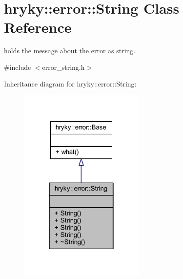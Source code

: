 \hypertarget{classhryky_1_1error_1_1_string}{\section{hryky\-:\-:error\-:\-:String Class Reference}
\label{classhryky_1_1error_1_1_string}
}


holds the message about the error as string.  




{\ttfamily \#include $<$error\-\_\-string.\-h$>$}



Inheritance diagram for hryky\-:\-:error\-:\-:String\-:
\nopagebreak
\begin{figure}[H]
\begin{center}
\leavevmode
\includegraphics[width=178pt]{classhryky_1_1error_1_1_string__inherit__graph}
\end{center}
\end{figure}
